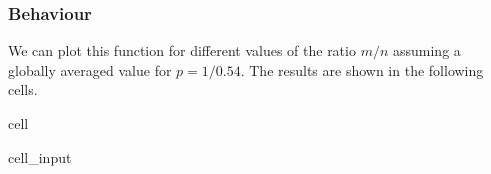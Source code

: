 \documentclass[letterpaper,10pt,english]{jupyterBook}
\begin{document}
\subsubsection{Behaviour}
\label{\detokenize{spl-solution:behaviour}}
\sphinxAtStartPar
We can plot this function for different values of the ratio \(m/n\) assuming a globally averaged value for \(p=1/0.54\). The results are shown in the following cells.

\begin{sphinxuseclass}{cell}\begin{sphinxVerbatimInput}

\begin{sphinxuseclass}{cell_input}
\begin{sphinxVerbatim}[commandchars=\\\{\}]
\end{sphinxVerbatim}

\end{sphinxuseclass}\end{sphinxVerbatimInput}

\end{sphinxuseclass}
\end{document}

